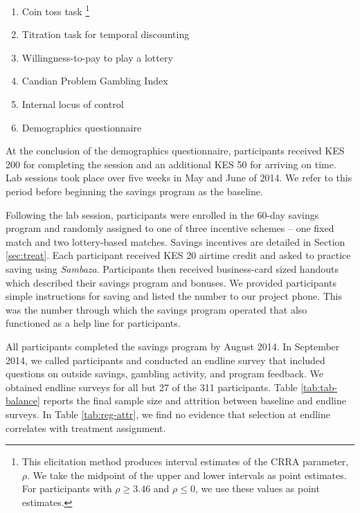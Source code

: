\documentclass[12pt]{article}
\begin{document}
		\begin{enumerate}
		\item Coin toss task \footnote{This elicitation method produces interval estimates of the CRRA parameter, $\rho$. We take the midpoint of the upper and lower intervals as point estimates. For participants with $\rho \geq 3.46$ and $\rho \leq 0$, we use these values as point estimates.}
		\item Titration task for temporal discounting 
		\item Willingness-to-pay to play a lottery
		\item Candian Problem Gambling Index 
		\item Internal locus of control 
		\item Demographics questionnaire
		\end{enumerate}

		At the conclusion of the demographics questionnaire, participants received KES 200 for completing the session and an additional KES 50 for arriving on time. Lab sessions took place over five weeks in May and June of 2014. We refer to this period before beginning the savings program as the baseline.

		Following the lab session, participants were enrolled in the 60-day savings program and randomly assigned to one of three incentive schemes -- one fixed match and two lottery-based matches. Savings incentives are detailed in Section \ref{sec:treat}. Each participant received KES 20 airtime credit and asked to practice saving using \textit{Sambaza}. Participants then received business-card sized handouts which described their savings program and bonuses. We provided participants simple instructions for saving and listed the number to our project phone. This was the number through which the savings program operated that also functioned as a help line for participants.


		All participants completed the savings program by August 2014. In September 2014, we called participants and conducted an endline survey that included questions on outside savings, gambling activity, and program feedback. We obtained endline surveys for all but 27 of the 311 participants. Table \ref{tab:tab-balance} reports the final sample size and attrition between baseline and endline surveys. In Table \ref{tab:reg-attr}, we find no evidence that selection at endline correlates with treatment assignment.
\end{document}

